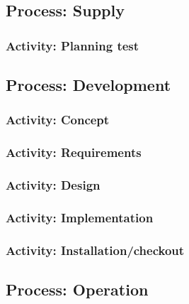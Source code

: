 	\subsection{Process: Supply} \label{s:details-of-the-master-test-plan:process-supply}
	
	\subsubsection{Activity: Planning test} \label{s:details-of-the-master-test-plan:activity-planning-tests}
	
	\subsection{Process: Development} \label{s:details-of-the-master-test-plan:process-development}
	
	\subsubsection{Activity: Concept} \label{s:details-of-the-master-test-plan:activity-concept}
	
	\subsubsection{Activity: Requirements} \label{s:details-of-the-master-test-plan:activity-requirements}
	
	\subsubsection{Activity: Design} \label{s:details-of-the-master-test-plan:activity-design}
	
	\subsubsection{Activity: Implementation} \label{s:details-of-the-master-test-plan:activity-implementation}
	
	\subsubsection{Activity: Installation/checkout} \label{s:details-of-the-master-test-plan:activity-installation-checkout}
	
	\subsection{Process: Operation} \label{s:details-of-the-master-test-plan:process-operation}
	
